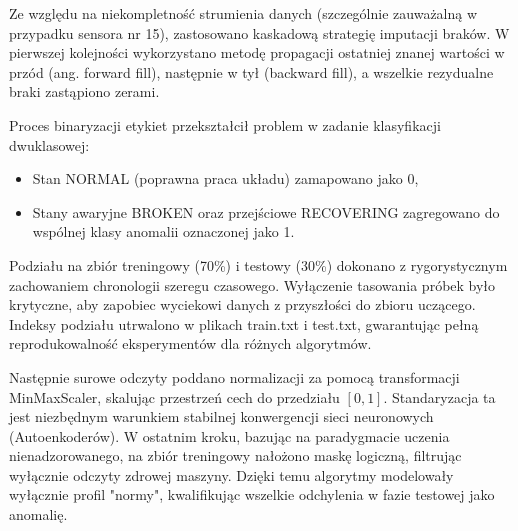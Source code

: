 \documentclass[12pt,twoside]{article}
\begin{document}
Ze względu na niekompletność strumienia danych (szczególnie zauważalną w przypadku sensora nr 15), zastosowano kaskadową strategię imputacji braków. W pierwszej kolejności wykorzystano metodę propagacji ostatniej znanej wartości w przód (ang. forward fill), następnie w tył (backward fill), a wszelkie rezydualne braki zastąpiono zerami.

Proces binaryzacji etykiet przekształcił problem w zadanie klasyfikacji dwuklasowej:
\begin{itemize}[label={--},labelsep=0.4cm,leftmargin=0.6cm]
\item Stan NORMAL (poprawna praca układu) zamapowano jako 0,
\item Stany awaryjne BROKEN oraz przejściowe RECOVERING zagregowano do wspólnej klasy anomalii oznaczonej jako 1.
\end{itemize}

Podziału na zbiór treningowy (70\%) i testowy (30\%) dokonano z rygorystycznym zachowaniem chronologii szeregu czasowego. Wyłączenie tasowania próbek było krytyczne, aby zapobiec wyciekowi danych z przyszłości do zbioru uczącego. Indeksy podziału utrwalono w plikach train.txt i test.txt, gwarantując pełną reprodukowalność eksperymentów dla różnych algorytmów.

Następnie surowe odczyty poddano normalizacji za pomocą transformacji MinMaxScaler, skalując przestrzeń cech do przedziału $[0, 1]$. Standaryzacja ta jest niezbędnym warunkiem stabilnej konwergencji sieci neuronowych (Autoenkoderów). W ostatnim kroku, bazując na paradygmacie uczenia nienadzorowanego, na zbiór treningowy nałożono maskę logiczną, filtrując wyłącznie odczyty zdrowej maszyny. Dzięki temu algorytmy modelowały wyłącznie profil "normy", kwalifikując wszelkie odchylenia w fazie testowej jako anomalię.
\end{document}
